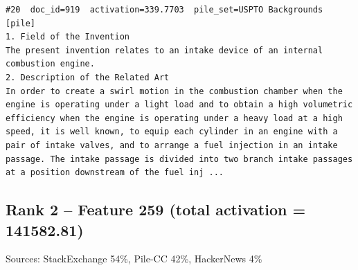 \begin{verbatim}
#20  doc_id=919  activation=339.7703  pile_set=USPTO Backgrounds  [pile]
1. Field of the Invention
The present invention relates to an intake device of an internal combustion engine.
2. Description of the Related Art
In order to create a swirl motion in the combustion chamber when the engine is operating under a light load and to obtain a high volumetric efficiency when the engine is operating under a heavy load at a high speed, it is well known, to equip each cylinder in an engine with a pair of intake valves, and to arrange a fuel injection in an intake passage. The intake passage is divided into two branch intake passages at a position downstream of the fuel inj ...

\end{verbatim}

\subsection*{Rank 2 -- Feature 259 (total activation = 141582.81)}

Sources: StackExchange 54\%, Pile-CC 42\%, HackerNews 4\%

